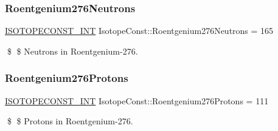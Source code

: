 \subsubsection{\texorpdfstring{Roentgenium276\+Neutrons}{Roentgenium276Neutrons}}
{\footnotesize\ttfamily \mbox{\hyperlink{group___isotope_const-_macros_ga5f18360b3e99483a35c32d789e62621c}{I\+S\+O\+T\+O\+P\+E\+C\+O\+N\+S\+T\+\_\+\+I\+NT}} Isotope\+Const\+::\+Roentgenium276\+Neutrons = 165}

\$ \$ Neutrons in Roentgenium-\/276. \mbox{\label{group___isotope_const-_roentgenium-_rg276_ga6c1f187047b4ecf489da5802b975c448}} 
\subsubsection{\texorpdfstring{Roentgenium276\+Protons}{Roentgenium276Protons}}
{\footnotesize\ttfamily \mbox{\hyperlink{group___isotope_const-_macros_ga5f18360b3e99483a35c32d789e62621c}{I\+S\+O\+T\+O\+P\+E\+C\+O\+N\+S\+T\+\_\+\+I\+NT}} Isotope\+Const\+::\+Roentgenium276\+Protons = 111}

\$ \$ Protons in Roentgenium-\/276. 